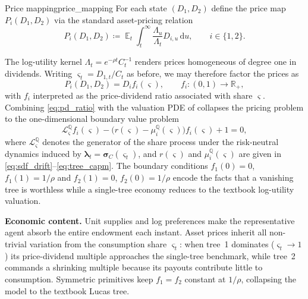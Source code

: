 ﻿\documentclass[11pt,letterpaper,oneside]{article}
\numberwithin{equation}{section}
\DeclareMathOperator{\E}{\mathbb{E}}
\newcommand{\1}{\mathbf{1}}
\newcommand{\diff}{\mathrm{d}}
\begin{document}
\begin{definition}{Price mapping}{price_mapping}
For each state $(D_1,D_2)$ define the price map $P_i(D_1,D_2)$ via the standard asset-pricing relation
\begin{equation}\label{eq:price_mapping}
  P_i(D_1,D_2) \coloneqq \E_t \int_t^{\infty} \frac{\Lambda_u}{\Lambda_t} D_{i,u}\,\diff u,\qquad i\in\{1,2\}.
\end{equation}
\end{definition}

The log-utility kernel $\Lambda_t = e^{-\rho t} C_t^{-1}$ renders prices homogeneous of degree one in dividends. Writing $\varsigma_t = D_{1,t}/C_t$ as before, we may therefore factor the prices as
\begin{equation}\label{eq:pd_ratio}
  P_i(D_1,D_2) = D_i f_i(\varsigma),\qquad f_i:(0,1)\to\mathbb{R}_+,
\end{equation}
with $f_i$ interpreted as the price-dividend ratio associated with share $\varsigma$. Combining \eqref{eq:pd_ratio} with the valuation PDE of  collapses the pricing problem to the one-dimensional boundary value problem
\begin{equation}\label{eq:ode_price}
  \mathcal{L}^{\mathbb{Q}}_{\varsigma} f_i(\varsigma) - \big(r(\varsigma)-\mu_i^{\mathbb{Q}}(\varsigma)\big) f_i(\varsigma) + 1 = 0,
\end{equation}
where $\mathcal{L}^{\mathbb{Q}}_{\varsigma}$ denotes the generator of the share process under the risk-neutral dynamics induced by $\bm{\lambda}_t = \bm{\sigma}_C(\varsigma_t)$, and $r(\varsigma)$ and $\mu_i^{\mathbb{Q}}(\varsigma)$ are given in \eqref{eq:sdf_drift}--\eqref{eq:tree_capm}. The boundary conditions $f_1(0)=0$, $f_1(1)=1/\rho$ and $f_2(1)=0$, $f_2(0)=1/\rho$ encode the facts that a vanishing tree is worthless while a single-tree economy reduces to the textbook log-utility valuation.

\begin{tcolorbox}[didacticstyle]
\textbf{Economic content.} Unit supplies and log preferences make the representative agent absorb the entire endowment each instant. Asset prices inherit all non-trivial variation from the consumption share $\varsigma_t$: when tree~1 dominates ($\varsigma_t\rightarrow 1$) its price-dividend multiple approaches the single-tree benchmark, while tree~2 commands a shrinking multiple because its payouts contribute little to consumption. Symmetric primitives keep $f_1=f_2$ constant at $1/\rho$, collapsing the model to the textbook Lucas tree.
\end{tcolorbox}
\end{document}
